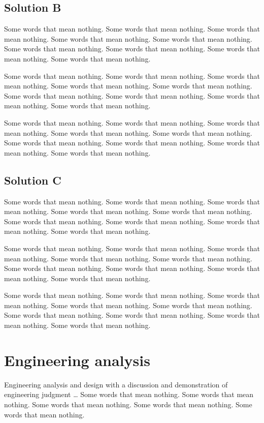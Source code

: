 \documentclass[11pt, a4paper]{article}
\begin{document}
\subsection{Solution B}
Some words that mean nothing. Some words that mean nothing. Some words that mean nothing. Some words that mean nothing. Some words that mean nothing. Some words that mean nothing. Some words that mean nothing. Some words that mean nothing. Some words that mean nothing.

Some words that mean nothing. Some words that mean nothing. Some words that mean nothing. Some words that mean nothing. Some words that mean nothing. Some words that mean nothing. Some words that mean nothing. Some words that mean nothing. Some words that mean nothing.

Some words that mean nothing. Some words that mean nothing. Some words that mean nothing. Some words that mean nothing. Some words that mean nothing. Some words that mean nothing. Some words that mean nothing. Some words that mean nothing. Some words that mean nothing.

\subsection{Solution C}
Some words that mean nothing. Some words that mean nothing. Some words that mean nothing. Some words that mean nothing. Some words that mean nothing. Some words that mean nothing. Some words that mean nothing. Some words that mean nothing. Some words that mean nothing.

Some words that mean nothing. Some words that mean nothing. Some words that mean nothing. Some words that mean nothing. Some words that mean nothing. Some words that mean nothing. Some words that mean nothing. Some words that mean nothing. Some words that mean nothing.

Some words that mean nothing. Some words that mean nothing. Some words that mean nothing. Some words that mean nothing. Some words that mean nothing. Some words that mean nothing. Some words that mean nothing. Some words that mean nothing. Some words that mean nothing.

\section{Engineering analysis}
Engineering analysis and design with a discussion and demonstration of engineering judgment \ldots
Some words that mean nothing. Some words that mean nothing. Some words that mean nothing. Some words that mean nothing. Some words that mean nothing.
\end{document}
